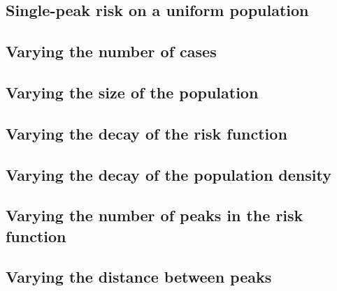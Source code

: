 \subsection{Single-peak risk on a uniform population}

\subsection{Varying the number of cases}

\subsection{Varying the size of the population}

\subsection{Varying the decay of the risk function}

\subsection{Varying the decay of the population density}

\subsection{Varying the number of peaks in the risk function}

\subsection{Varying the distance between peaks}

